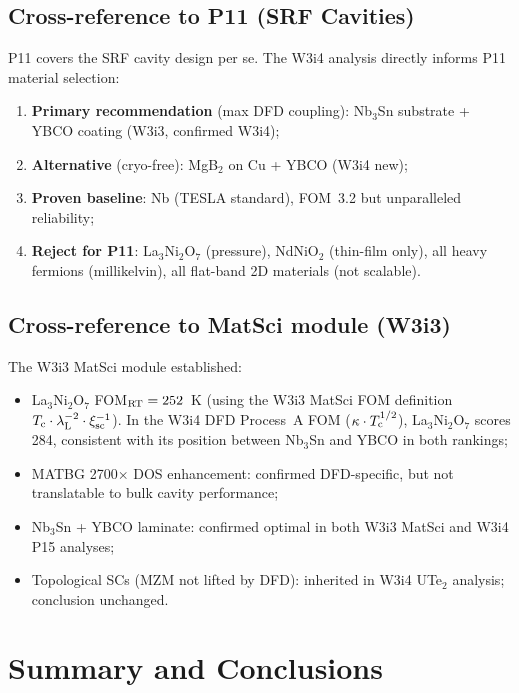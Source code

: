 \documentclass[11pt]{article}
\newcommand{\lambdaL}{\lambda_{\rm L}}
\newcommand{\xsc}{\xi_{\rm sc}}
\newcommand{\Tc}{T_{\rm c}}
\begin{document}
\subsection{Cross-reference to P11 (SRF Cavities)}

P11 covers the SRF cavity design per se. The W3i4 analysis directly informs
P11 material selection:

\begin{enumerate}
\item \textbf{Primary recommendation} (max DFD coupling): Nb$_3$Sn substrate
  + YBCO coating (W3i3, confirmed W3i4);
\item \textbf{Alternative} (cryo-free): MgB$_2$ on Cu + YBCO (W3i4 new);
\item \textbf{Proven baseline}: Nb (TESLA standard), FOM~3.2 but unparalleled
  reliability;
\item \textbf{Reject for P11}: La$_3$Ni$_2$O$_7$ (pressure), NdNiO$_2$
  (thin-film only), all heavy fermions (millikelvin), all flat-band 2D
  materials (not scalable).
\end{enumerate}

\subsection{Cross-reference to MatSci module (W3i3)}

The W3i3 MatSci module established:
\begin{itemize}
\item La$_3$Ni$_2$O$_7$ FOM$_{\rm RT} = 252$~K (using the W3i3 MatSci FOM
  definition $\Tc \cdot \lambdaL^{-2} \cdot \xsc^{-1}$). In the W3i4 DFD
  Process~A FOM ($\kappa \cdot \Tc^{1/2}$), La$_3$Ni$_2$O$_7$ scores 284,
  consistent with its position between Nb$_3$Sn and YBCO in both rankings;
\item MATBG 2700$\times$ DOS enhancement: confirmed DFD-specific, but not
  translatable to bulk cavity performance;
\item Nb$_3$Sn + YBCO laminate: confirmed optimal in both W3i3 MatSci and
  W3i4 P15 analyses;
\item Topological SCs (MZM not lifted by DFD): inherited in W3i4 UTe$_2$
  analysis; conclusion unchanged.
\end{itemize}

\section{Summary and Conclusions}
\label{sec:summary}
\end{document}
